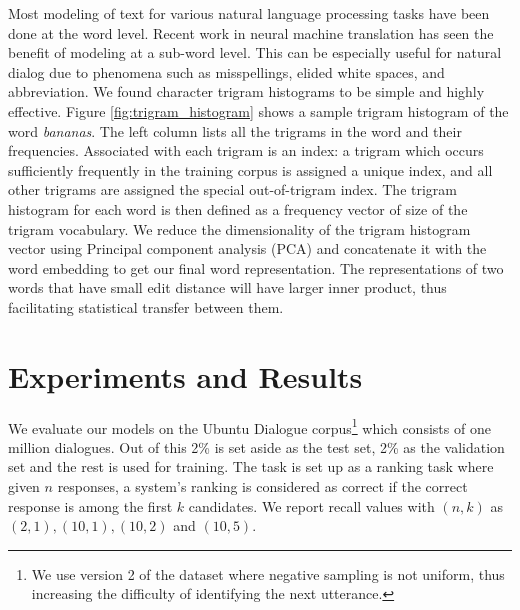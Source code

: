 \documentclass[11pt]{report}
\begin{document}
Most modeling of text for various natural language processing tasks have been done at the word level. Recent work in neural machine translation has seen the benefit of modeling at a sub-word level. This can be especially useful for natural dialog due to phenomena such as misspellings, elided white spaces, and abbreviation. We found character trigram histograms to be simple and highly effective. Figure \ref{fig:trigram_histogram} shows a sample trigram histogram of the word \textit{bananas}. The left column lists all the trigrams in the word and their frequencies.  Associated with each trigram is an index: a trigram which occurs sufficiently frequently in the training corpus is assigned a unique index, and all other trigrams are assigned the special out-of-trigram index. The trigram histogram for each word is then defined as a frequency vector of size of the trigram vocabulary.  %
We reduce the dimensionality of the trigram histogram vector using Principal component analysis (PCA) \cite{tipping1999probabilistic} and concatenate it with the word embedding to get our final word representation. The representations of two words that have small edit distance will have larger inner product, thus facilitating statistical transfer between them.

\section{Experiments and Results}\label{experiments_results}

We evaluate our models on the Ubuntu Dialogue corpus\footnote{We use version 2 of the dataset where negative sampling is not uniform, thus increasing the difficulty of identifying the next utterance.} which consists of one million dialogues. Out of this 2\% is set aside as the test set, 2\% as the validation set and the rest is used for training. The task is set up as a ranking task where given $n$ responses, a system's ranking is considered as correct if the correct response is among the first $k$ candidates. We report recall values with $(n,k)$ as $(2,1), (10, 1), (10, 2)$ and $(10, 5)$. 
\end{document}

